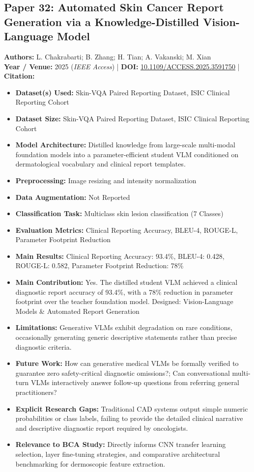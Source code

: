 \documentclass[11pt,a4paper]{article}
\begin{document}
\subsection{Paper 32: Automated Skin Cancer Report Generation via a Knowledge-Distilled Vision-Language Model}
\textbf{Authors:} L. Chakrabarti; B. Zhang; H. Tian; A. Vakanski; M. Xian \\
\textbf{Year / Venue:} 2025 (\textit{IEEE Access}) | \textbf{DOI:} \href{https://doi.org/10.1109/ACCESS.2025.3591750}{10.1109/ACCESS.2025.3591750} | \textbf{Citation:} \cite{11091320}

\begin{itemize}\small
\item \textbf{Dataset(s) Used:} Skin-VQA Paired Reporting Dataset, ISIC Clinical Reporting Cohort
\item \textbf{Dataset Size:} Skin-VQA Paired Reporting Dataset, ISIC Clinical Reporting Cohort
\item \textbf{Model Architecture:} Distilled knowledge from large-scale multi-modal foundation models into a parameter-efficient student VLM conditioned on dermatological vocabulary and clinical report templates.
\item \textbf{Preprocessing:} Image resizing and intensity normalization
\item \textbf{Data Augmentation:} Not Reported
\item \textbf{Classification Task:} Multiclass skin lesion classification (7 Classes)
\item \textbf{Evaluation Metrics:} Clinical Reporting Accuracy, BLEU-4, ROUGE-L, Parameter Footprint Reduction
\item \textbf{Main Results:} Clinical Reporting Accuracy: 93.4\%, BLEU-4: 0.428, ROUGE-L: 0.582, Parameter Footprint Reduction: 78\%
\item \textbf{Main Contribution:} Yes. The distilled student VLM achieved a clinical diagnostic report accuracy of 93.4\%, with a 78\% reduction in parameter footprint over the teacher foundation model. Designed: Vision-Language Models \& Automated Report Generation
\item \textbf{Limitations:} Generative VLMs exhibit degradation on rare conditions, occasionally generating generic descriptive statements rather than precise diagnostic criteria.
\item \textbf{Future Work:} How can generative medical VLMs be formally verified to guarantee zero safety-critical diagnostic omissions?; Can conversational multi-turn VLMs interactively answer follow-up questions from referring general practitioners?
\item \textbf{Explicit Research Gaps:} Traditional CAD systems output simple numeric probabilities or class labels, failing to provide the detailed clinical narrative and descriptive diagnostic report required by oncologists.
\item \textbf{Relevance to BCA Study:} Directly informs CNN transfer learning selection, layer fine-tuning strategies, and comparative architectural benchmarking for dermoscopic feature extraction.
\end{itemize}
\end{document}
